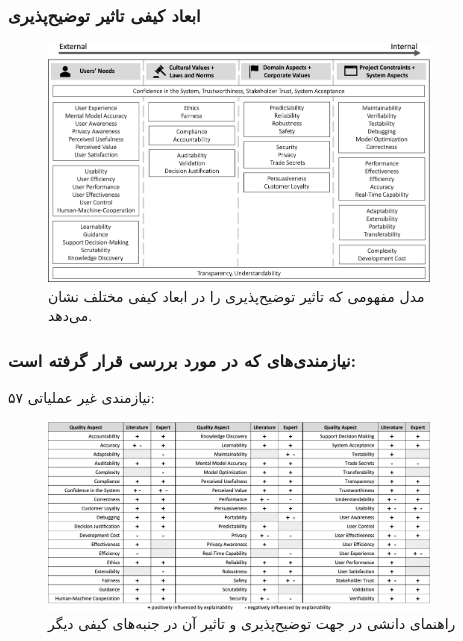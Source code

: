 \documentclass[10pt, a4paper]{beamer}
\begin{document}
\begin{frame}
    \frametitle{ابعاد کیفی تاثیر توضیح‌پذیری}

    \begin{figure}[H]
        \centering
        \includegraphics[width=0.9\textwidth]{images/conceptual_model.png}
        \caption{مدل مفهومی که تاثیر توضیح‌پذیری را در ابعاد کیفی مختلف نشان
        می‌دهد.}
        \label{fig:conceptualmodel}
    \end{figure}
\end{frame}

\begin{frame}
    \frametitle{نیازمندی‌های  که در  مورد بررسی قرار گرفته است:}
    ۵۷ نیازمندی غیر عملیاتی:

    \begin{figure}[H]
        \centering
    \includegraphics[width=0.9\textwidth]{images/knowledge_catalogue.png}
        \caption{راهنمای دانشی در جهت توضیح‌پذیری و تاثیر آن در جنبه‌های کیفی
        دیگر}
        \label{fig:slrOrder}
    \end{figure}
\end{frame}
\end{document}

